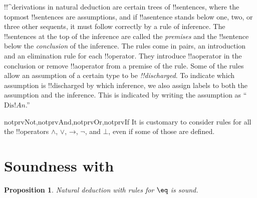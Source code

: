 \documentclass[10pt,a4paper]{article}
\theoremstyle{plain}
\newtheorem{prop}[thm]{Proposition}
\theoremstyle{definition}
\theoremstyle{remark}
\newcommand*{\olfileid}[3]{}
\newcommand*{\olsection}[1]{\section*{#1}}
\providecommand{\lif}{\mathbin{\rightarrow}}
\providecommand{\lfalse}{\bot}
\providecommand{\iftag}[1]{#1}
\providecommand{\Discharge}{\mathrm{Dis}}
\providecommand{\iftag}{}
\begin{document}
!!^{derivation}s in natural deduction are certain trees of
!!{sentence}s, where the topmost !!{sentence}s are assumptions, and if
!!a{sentence} stands below one, two, or three other sequents, it must
follow correctly by a rule of inference. The !!{sentence}s at the top
of the inference are called the \emph{premises} and the !!{sentence}
below the \emph{conclusion} of the inference.  The rules come in
pairs, an introduction and an elimination rule for each
!!{operator}. They introduce !!a{operator} in the conclusion or
remove !!a{operator} from a premise of the rule.  Some of the rules
allow an assumption of a certain type to be \emph{!!{discharged}}. To
indicate which assumption is !!{discharged} by which inference, we
also assign labels to both the assumption and the inference.  This is
indicated by writing the assumption as ``$\Discharge{!A}{n}$.''


\iftag{notprvNot,notprvAnd,notprvOr,notprvIf}{}%
	{It is customary to consider rules for all the !!{operator}s $\land$, $\lor$, $\lif$, $\lnot$, and $\lfalse$, even if some of those are defined.}







\olfileid{fol}{ntd}{sid}

\olsection{Soundness with }

\begin{prop}
Natural deduction with rules for $\eq$ is sound.
\end{prop}
\end{document}
